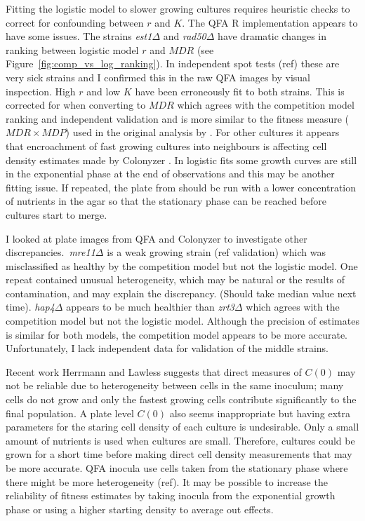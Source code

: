 Fitting the logistic model to slower growing cultures requires
heuristic checks to correct for confounding between \(r\) and
\(K\). The QFA R implementation appears to have some issues. The
strains \textit{est1\(\Delta\)} and \textit{rad50\(\Delta\)} have
dramatic changes in ranking between logistic model \(r\) and \(MDR\)
(see Figure~\ref{fig:comp_vs_log_ranking}). In independent spot tests
(ref) these are very sick strains and I confirmed this in the raw QFA
images by visual inspection. High \(r\) and low \(K\) have been
erroneously fit to both strains. This is corrected for when converting
to \(MDR\) which agrees with the competition model ranking and
independent validation and is more similar to the fitness measure
(\(MDR \times MDP\)) used in the original analysis by
\citet{Addinall2011}. For other cultures it appears that encroachment
of fast growing cultures into neighbours is affecting cell density
estimates made by Colonyzer \citep{Lawless2010}. In logistic fits some
growth curves are still in the exponential phase at the end of
observations and this may be another fitting issue. If repeated, the
plate from \citet{Addinall2011} should be run with a lower
concentration of nutrients in the agar so that the stationary phase
can be reached before cultures start to merge.

I looked at plate images from QFA and Colonyzer to investigate other
discrepancies.~\textit{mre11\(\Delta\)} is a weak growing strain (ref
validation) which was misclassified as healthy by the competition
model but not the logistic model. One repeat contained unusual
heterogeneity, which may be natural or the results of contamination,
and may explain the discrepancy. (Should take median value next
time). \textit{hap4\(\Delta\)} appears to be much healthier
than \textit{zrt3\(\Delta\)} which agrees with the competition model
but not the logistic model. Although the precision of estimates is
similar for both models, the competition model appears to be more
accurate. Unfortunately, I lack independent data for validation of the
middle strains.

Recent work Herrmann and Lawless suggests that direct measures of
\(C(0)\) may not be reliable due to heterogeneity between cells
in the same inoculum; many cells do not grow and only the fastest
growing cells contribute significantly to the final population. A
plate level \(C(0)\) also seems inappropriate but having extra
parameters for the staring cell density of each culture is
undesirable. Only a small amount of nutrients is used when cultures
are small. Therefore, cultures could be grown for a short time before
making direct cell density measurements that may be more accurate. QFA
inocula use cells taken from the stationary phase where there might be
more heterogeneity (ref). It may be possible to increase the
reliability of fitness estimates by taking inocula from the
exponential growth phase or using a higher starting density to average
out effects.

